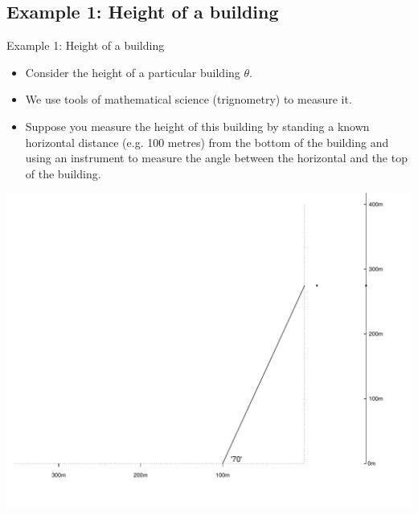 \documentclass[10pt,handout]{beamer}\usepackage[]{graphicx}\usepackage[]{color}
\makeatletter
\def\maxwidth{ %
  \ifdim\Gin@nat@width>\linewidth
    \linewidth
  \else
    \Gin@nat@width
  \fi
}
\newenvironment{knitrout}{}{} %
\makeatother
\begin{document}
\subsection{Example 1: Height of a building}

\begin{frame}{Example 1: Height of a building}
\begin{itemize}
	\item Consider the height of a particular building \(\theta\).
	\item We use tools of mathematical science (trignometry) to	measure it. 	
\item Suppose you measure the height of this building by standing a known horizontal distance (e.g. 100 metres) from the bottom of the building	and using an instrument to measure the angle between the horizontal and the top of the building.
\end{itemize}
\end{frame}




\begin{frame}
	
\begin{knitrout}\tiny
{}\color{fgcolor}

{\centering \includegraphics[width=\maxwidth]{figure/hanley-fig3-1} 

}


\end{knitrout}
	
	
\end{frame}
\end{document}
